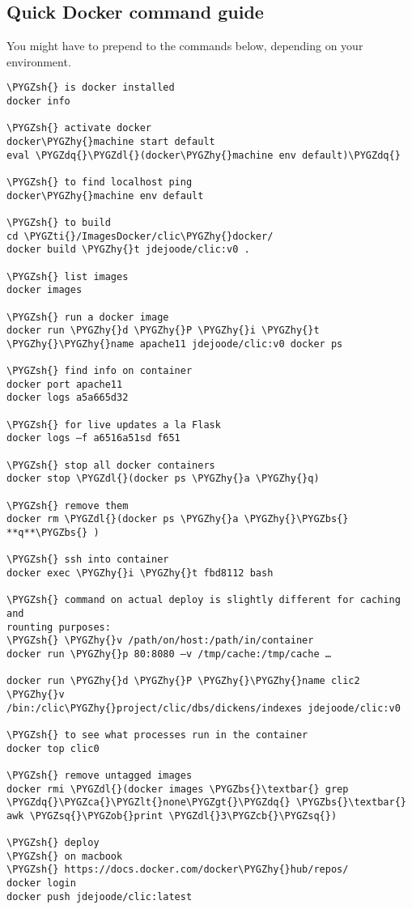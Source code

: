 \documentclass[letterpaper,10pt,english]{sphinxmanual}
\def\PYGZbs{\char`\\}
\def\PYGZob{\char`\{}
\def\PYGZcb{\char`\}}
\def\PYGZca{\char`\^}
\def\PYGZlt{\char`\<}
\def\PYGZgt{\char`\>}
\def\PYGZsh{\char`\#}
\def\PYGZdl{\char`\$}
\def\PYGZhy{\char`\-}
\def\PYGZsq{\char`\'}
\def\PYGZdq{\char`\"}
\def\PYGZti{\char`\~}
\renewcommand\PYGZsq{\textquotesingle}
\begin{document}
\subsection{Quick Docker command guide}
\label{admin:quick-docker-command-guide}
You might have to prepend  to the commands below, depending on your
environment.

\begin{Verbatim}[commandchars=\\\{\}]
\PYGZsh{} is docker installed
docker info

\PYGZsh{} activate docker
docker\PYGZhy{}machine start default
eval \PYGZdq{}\PYGZdl{}(docker\PYGZhy{}machine env default)\PYGZdq{}

\PYGZsh{} to find localhost ping
docker\PYGZhy{}machine env default

\PYGZsh{} to build
cd \PYGZti{}/ImagesDocker/clic\PYGZhy{}docker/
docker build \PYGZhy{}t jdejoode/clic:v0 .

\PYGZsh{} list images
docker images

\PYGZsh{} run a docker image
docker run \PYGZhy{}d \PYGZhy{}P \PYGZhy{}i \PYGZhy{}t \PYGZhy{}\PYGZhy{}name apache11 jdejoode/clic:v0 docker ps

\PYGZsh{} find info on container
docker port apache11
docker logs a5a665d32

\PYGZsh{} for live updates a la Flask
docker logs –f a6516a51sd f651

\PYGZsh{} stop all docker containers
docker stop \PYGZdl{}(docker ps \PYGZhy{}a \PYGZhy{}q)

\PYGZsh{} remove them
docker rm \PYGZdl{}(docker ps \PYGZhy{}a \PYGZhy{}\PYGZbs{} **q**\PYGZbs{} )

\PYGZsh{} ssh into container
docker exec \PYGZhy{}i \PYGZhy{}t fbd8112 bash

\PYGZsh{} command on actual deploy is slightly different for caching and
rounting purposes:
\PYGZsh{} \PYGZhy{}v /path/on/host:/path/in/container
docker run \PYGZhy{}p 80:8080 –v /tmp/cache:/tmp/cache …

docker run \PYGZhy{}d \PYGZhy{}P \PYGZhy{}\PYGZhy{}name clic2 \PYGZhy{}v
/bin:/clic\PYGZhy{}project/clic/dbs/dickens/indexes jdejoode/clic:v0

\PYGZsh{} to see what processes run in the container
docker top clic0

\PYGZsh{} remove untagged images
docker rmi \PYGZdl{}(docker images \PYGZbs{}\textbar{} grep \PYGZdq{}\PYGZca{}\PYGZlt{}none\PYGZgt{}\PYGZdq{} \PYGZbs{}\textbar{} awk \PYGZsq{}\PYGZob{}print \PYGZdl{}3\PYGZcb{}\PYGZsq{})

\PYGZsh{} deploy
\PYGZsh{} on macbook
\PYGZsh{} https://docs.docker.com/docker\PYGZhy{}hub/repos/
docker login
docker push jdejoode/clic:latest
\end{Verbatim}
\end{document}
